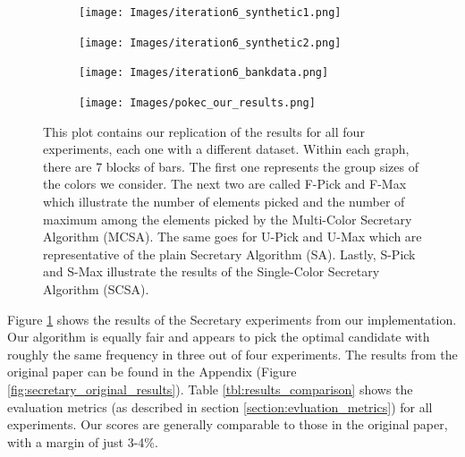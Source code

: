 \begin{figure}[h!]
  \begin{minipage}{\linewidth}
      \centering
      \begin{minipage}{0.45\linewidth}
          \begin{figure}[H]
              \texttt{[image: Images/iteration6\_synthetic1.png]}
          \end{figure}
      \end{minipage}
      \begin{minipage}{0.45\linewidth}
          \begin{figure}[H]
              \texttt{[image: Images/iteration6\_synthetic2.png]}
          \end{figure}
      \end{minipage}
      \begin{minipage}{0.45\linewidth}
          \begin{figure}[H]
              \texttt{[image: Images/iteration6\_bankdata.png]}
          \end{figure}
      \end{minipage}
      \begin{minipage}{0.45\linewidth}
          \begin{figure}[H]
              \texttt{[image: Images/pokec\_our\_results.png]}
          \end{figure}
      \end{minipage}
  \end{minipage}
  \caption{This plot contains our replication of the results for all four experiments, each one with a different dataset. Within each graph, there are 7 blocks of bars. The first one represents the group sizes of the colors we consider. The next two are called F-Pick and F-Max which illustrate the number of elements picked and the number of maximum among the elements picked by the Multi-Color Secretary Algorithm (MCSA). The same goes for U-Pick and U-Max which are representative of the plain Secretary Algorithm (SA). Lastly, S-Pick and S-Max illustrate the results of the Single-Color Secretary Algorithm (SCSA).}
  \label{fig:secretary_results}
\end{figure}
%
Figure \ref{fig:secretary_results} shows the results of the Secretary experiments from our implementation. Our algorithm is equally fair and appears to pick the optimal candidate with roughly the same frequency in three out of four experiments. The results from the original paper can be found in the Appendix (Figure \ref{fig:secretary_original_results}). Table \ref{tbl:results_comparison} shows the evaluation metrics (as described in section \ref{section:evluation_metrics})  for all experiments. Our scores are generally comparable to those in the original paper, with a margin of just 3-4\%.

